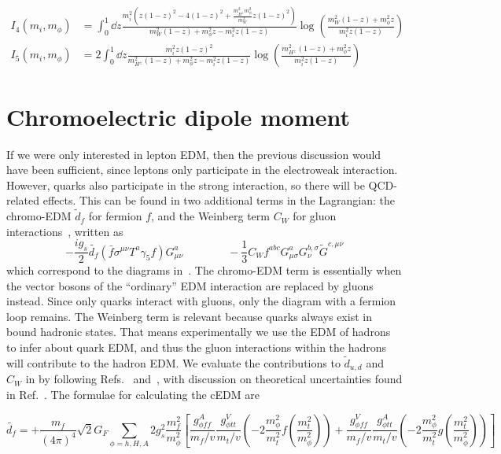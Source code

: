 \begin{adjustwidth}{-2.5cm}{-2.5cm}
	\begin{align}
	I_{4}(m_{i}, m_{\phi}) &= \int_0^1 \dd{z} \frac{m_i^2\left(z(1-z)^2-4(1-z)^2+\frac{m_{H^{\pm}}^{2}m_\phi^2}{m_W^2} z(1-z)^2\right)}{m_W^2(1-z)+m_\phi^2 z-m_i^2 z(1-z)} \log \left(\frac{m_W^2(1-z)+m_\phi^2 z}{m_i^2 z(1-z)}\right)\\
	I_{5}(m_{i}, m_{\phi}) &= 2 \int_0^1 \dd{z} \frac{m_i^2 z(1-z)^2}{m_{H^{\pm}}^2(1-z)+m_\phi^2 z-m_i^2 z(1-z)} \log \left(\frac{m_{H^{\pm}}^2(1-z)+m_\phi^2 z}{m_i^2 z(1-z)}\right)
	\end{align}
\end{adjustwidth}

\section{Chromoelectric dipole moment}
If we were only interested in lepton EDM, then the previous discussion would have been sufficient, since leptons only participate in the electroweak interaction.
However, quarks also participate in the strong interaction, so there will be QCD-related effects.
This can be found in two additional terms in the Lagrangian: 
the chromo-EDM \(\tilde{d}_{f} \) for fermion \(f \), and the Weinberg term \(C_{W} \) for gluon interactions~\cite{Weinberg1989Gluon}, written as
\begin{equation}
  -\frac{i g_{s}}{2}\tilde{d_{f}}\left(\bar{f}\sigma^{\mu\nu}T^{a}\gamma_{5}f\right)G^{a}_{\mu\nu}\quad \qquad \quad -\frac{1}{3}C_Wf^{abc}G^{a}_{\mu\sigma}G^{b,\sigma}_{\nu}\tilde{G}^{c,\mu\nu}
\end{equation}
which correspond to the diagrams in~.
The chromo-EDM term is essentially when the vector bosons of the ``ordinary'' EDM interaction are replaced by gluons instead.
Since only quarks interact with gluons, only the diagram with a fermion loop remains.
The Weinberg term is relevant because quarks always exist in bound hadronic states.
That means experimentally we use the EDM of hadrons to infer about quark EDM, and thus the gluon interactions within the hadrons will contribute to the hadron EDM.
We evaluate the contributions to \(\tilde{d}_{u, d} \) and \(C_{W} \) in {\gthdm} by following Refs.~\cite{Abe14} and~\cite{JungPich14}, with discussion on theoretical uncertainties found in Ref.~\cite{KanetaEtAl23}.
The formulae for calculating the cEDM are

\begin{adjustwidth}{-1.5cm}{-1.5cm}
	\begin{equation}
	\tilde{d_{f}} = +\frac{m_{f}}{(4\pi)^{4}}\sqrt{2}G_{F}\sum_{\phi=h,H,A}2g_{s}^{2}\frac{m_{f}^{2}}{m_{\phi}^{2}}
	\left[\frac{g_{\phi ff}^{A}}{m_{f}/v}\frac{g_{\phi tt}^{V}}{m_{t}/v}\left(-2\frac{m_{\phi}^{2}}{m_{t}^{2}} f\left(\frac{m_{t}^{2}}{m_{\phi}^{2}}\right)\right) 
	+ \frac{g_{\phi ff}^{V}}{m_{f}/v}\frac{g_{\phi tt}^{A}}{m_{t}/v}\left(-2\frac{m_{\phi}^{2}}{m_{t}^{2}} g\left(\frac{m_{t}^{2}}{m_{\phi}^{2}}\right)\right)\right]
	\end{equation}
\end{adjustwidth}

